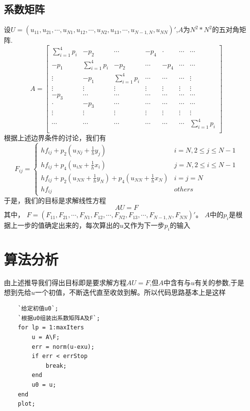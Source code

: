\documentclass[a4paper,left=2.5cm,right=2.5cm]{article}
\begin{document}
\begin{spacing}{1.6}
	\section{系数矩阵}
	设$U=(u_{11},u_{21},\cdots,u_{N1},u_{12},\cdots,u_{N2},u_{13},\cdots,u_{N-1,N},u_{NN})'$,$A$为$N^2*N^2$的五对角矩阵.
	\begin{equation}
	A = 
	\left[
	\begin{array}{ccccccc}
		\sum\limits_{i=1}^{4}p_i&-p_2&\cdots&-p_4&\cdot&\cdots&\cdots\\
		-p_1&\sum\limits_{i=1}^{4}p_i&-p_2&\cdots&-p_4&\cdots&\cdots\\
		\vdots&-p_1&\sum\limits_{i=1}^{4}p_i&\cdots&\cdots&\cdots&\vdots\\
		\vdots&\vdots&\vdots&\vdots&\vdots&\vdots&\vdots\\
		-p_3& \cdots&\cdots&\cdots&\cdots&\cdots&\cdots\\
		\cdot& -p_3&\cdots&\cdots&\cdots&\cdots&\cdots\\
		\vdots&\vdots&\vdots&\vdots&\vdots&\vdots&\vdots\\
		\cdots&\cdots&\cdots&\cdots&\cdots&\cdots&\sum\limits_{i=1}^{4}p_i\\
	\end{array}
	\right]
	\end{equation}	
	根据上述边界条件的讨论，我们有
	\begin{equation}
	F_{ij}=\left\{
	\begin{array}{ll}
	hf_{ij} + p_2(u_{Nj}+\frac{1}{h}y_j) & i=N,2\le j \le N-1\\
	hf_{ij} + p_4(u_{iN}+\frac{1}{h}x_i) & j=N,2\le i \le N-1\\
	hf_{ij} + p_2(u_{NN}+\frac{1}{h}y_N)+p_4(u_{NN}+\frac{1}{h}x_N)& i=j=N\\
	hf_{ij}& others
	\end{array}
	\right.
	\end{equation}
	于是，我们的目标是求解线性方程
	\begin{equation}
	AU = F
	\end{equation}
	其中，
	$F=(F_{11},F_{21},\cdots,F_{N1},F_{12},\cdots,F_{N2},F_{13},\cdots,F_{N-1,N},F_{NN})'$。
	$A$中的$p_i$是根据上一步的值确定出来的，每次算出的$u$又作为下一步$p_i$的输入
	\end{spacing}
	\section{算法分析}
	由上述推导我们得出目标即是要求解方程$AU=F$,但$A$中含有与$u$有关的参数,于是想到先给$u$一个初值，不断迭代直至收敛到解。所以代码思路基本上是这样
	\begin{lstlisting}
	`给定初值u0`;
	`根据u0组装出系数矩阵A及F`;
	for lp = 1:maxIters
		u = A\F;
		err = norm(u-exu);
		if err < errStop
			break;
		end
		u0 = u;
	end
	plot;	
	\end{lstlisting}
\end{document}
